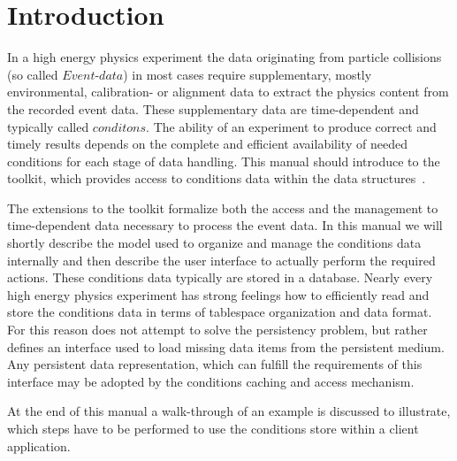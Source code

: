 \documentclass[10pt,a4paper]{article}
\begin{document}
\clearpage
%
%
\tableofcontents
\clearpage
%
%
\setcounter{page}{1}

\section{Introduction}
\label{sec:ddcond-user-manual-introduction}
\noindent
In a high energy physics experiment the data originating from particle 
collisions (so called $Event$-$data$) in most cases require supplementary, 
mostly  environmental, calibration- or alignment data to extract the physics
content from the recorded event data. These supplementary data are 
time-dependent and  typically called $conditons$. The ability of an 
experiment to produce correct and timely results depends on the complete 
and efficient availability of  needed conditions for each stage of data 
handling. This manual should introduce to the \DDC toolkit, which provides 
access to conditions data within the \DDH data structures~\cite{bib:dd4hep-manual}.

\noindent
The \DDC extensions to the \DDH toolkit formalize both the access and 
the management to time-dependent data necessary to process the event data.
In this manual we will shortly describe the model used to organize and manage 
the conditions data internally and then describe the user interface to
actually perform the required actions.
These conditions data typically are stored in a database. Nearly every
high energy physics experiment has strong feelings how to efficiently
read and store the conditions data in terms of tablespace organization 
and data format.
For this reason \DDC does not attempt to solve the persistency problem,
but rather defines an interface used to load missing data items from the 
persistent medium. Any persistent data representation, which can fulfill
the requirements of this interface may be adopted by the \DDC 
conditions caching and access mechanism.

\noindent
At the end of this manual a walk-through of an example is discussed to 
illustrate, which steps have to be performed to use the \DDH conditions
store within a client application.
\end{document}

